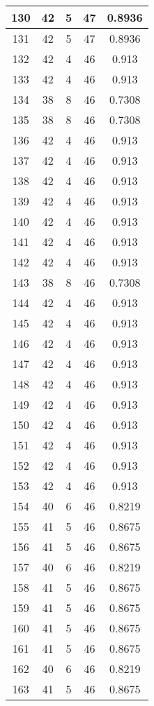 \documentclass[letterpaper, 12pt]{article}
\begin{document}
\begin{longtable}{|c|c|c|c|c|}
\hline
130 & 42 & 5 & 47 & 0.8936 \\
\hline
131 & 42 & 5 & 47 & 0.8936 \\
\hline
132 & 42 & 4 & 46 & 0.913 \\
\hline
133 & 42 & 4 & 46 & 0.913 \\
\hline
134 & 38 & 8 & 46 & 0.7308 \\
\hline
135 & 38 & 8 & 46 & 0.7308 \\
\hline
136 & 42 & 4 & 46 & 0.913 \\
\hline
137 & 42 & 4 & 46 & 0.913 \\
\hline
138 & 42 & 4 & 46 & 0.913 \\
\hline
139 & 42 & 4 & 46 & 0.913 \\
\hline
140 & 42 & 4 & 46 & 0.913 \\
\hline
141 & 42 & 4 & 46 & 0.913 \\
\hline
142 & 42 & 4 & 46 & 0.913 \\
\hline
143 & 38 & 8 & 46 & 0.7308 \\
\hline
144 & 42 & 4 & 46 & 0.913 \\
\hline
145 & 42 & 4 & 46 & 0.913 \\
\hline
146 & 42 & 4 & 46 & 0.913 \\
\hline
147 & 42 & 4 & 46 & 0.913 \\
\hline
148 & 42 & 4 & 46 & 0.913 \\
\hline
149 & 42 & 4 & 46 & 0.913 \\
\hline
150 & 42 & 4 & 46 & 0.913 \\
\hline
151 & 42 & 4 & 46 & 0.913 \\
\hline
152 & 42 & 4 & 46 & 0.913 \\
\hline
153 & 42 & 4 & 46 & 0.913 \\
\hline
154 & 40 & 6 & 46 & 0.8219 \\
\hline
155 & 41 & 5 & 46 & 0.8675 \\
\hline
156 & 41 & 5 & 46 & 0.8675 \\
\hline
157 & 40 & 6 & 46 & 0.8219 \\
\hline
158 & 41 & 5 & 46 & 0.8675 \\
\hline
159 & 41 & 5 & 46 & 0.8675 \\
\hline
160 & 41 & 5 & 46 & 0.8675 \\
\hline
161 & 41 & 5 & 46 & 0.8675 \\
\hline
162 & 40 & 6 & 46 & 0.8219 \\
\hline
163 & 41 & 5 & 46 & 0.8675 \\
\hline

\end{longtable}
\end{document}
